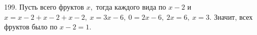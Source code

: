 199. Пусть всего фруктов $x,$  тогда каждого вида по $x-2$ и $x=x-2+x-2+x-2,\ x=3x-6,\ 0=2x-6,\ 2x=6,\ x=3.$ Значит, всех фруктов было по $x-2=1.$\\
